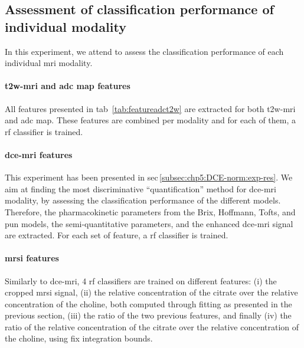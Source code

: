 \subsection{Assessment of classification performance of individual modality}\label{subec:chp6:exp-res:Ex1}

In this experiment, we attend to assess the classification performance of each individual \ac{mri} modality.

\paragraph{\ac{t2w}-\ac{mri} and \ac{adc} map features} All features presented in \acs{tab}~\ref{tab:featureadct2w} are extracted for both \ac{t2w}-\ac{mri} and \ac{adc} map.
These features are combined per modality and for each of them, a \ac{rf} classifier is trained.

\paragraph{\ac{dce}-\ac{mri} features} This experiment has been presented in \acs{sec}\,\ref{subsec:chp5:DCE-norm:exp-res}.
We aim at finding the most discriminative ``quantification'' method for \ac{dce}-\ac{mri} modality, by assessing the classification performance of the different models.
Therefore, the pharmacokinetic parameters from the Brix, Hoffmann, Tofts, and \ac{pun} models, the semi-quantitative parameters, and the enhanced \ac{dce}-\ac{mri} signal are extracted.
For each set of feature, a \ac{rf} classifier is trained.

\paragraph{\ac{mrsi} features} Similarly to \ac{dce}-\ac{mri}, 4 \ac{rf} classifiers are trained on different features:
(i) the cropped \ac{mrsi} signal,
(ii) the relative concentration of the citrate over the relative concentration of the choline, both computed through fitting as presented in the previous section,
(iii) the ratio of the two previous features, and finally
(iv) the ratio of the relative concentration of the citrate over the relative concentration of the choline, using fix integration bounds.

